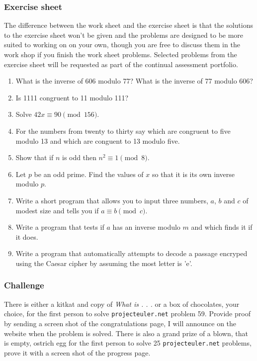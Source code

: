 \documentclass[12pt]{article}
\begin{document}
\subsubsection*{Exercise sheet}

The difference between the work sheet and the exercise sheet is that
the solutions to the exercise sheet won't be given and the problems
are designed to be more suited to working on on your own, though you
are free to discuss them in the work shop if you finish the work sheet
problems. Selected problems from the exercise sheet will be requested
as part of the continual assessment portfolio.

\begin{enumerate}

\item What is the inverse of 606 modulo 77? What is the inverse of 77 modulo 606?

\item Is 1111 congruent to 11 modulo 111?

\item Solve $42x\equiv 90 \pmod {156}$.

\item For the numbers from twenty to thirty say which are congruent to
  five modulo 13 and which are conguent to 13 modulo five.

\item Show that if $n$ is odd then $n^2\equiv 1\pmod 8$.

\item Let $p$ be an odd prime. Find the values of $x$ so that it is
  its own inverse modulo $p$.

\item Write a short program that allows you to input three numbers,
  $a$, $b$ and $c$ of modest size and tells you if $a\equiv b \pmod
  c$.

\item Write a program that tests if $a$ has an inverse modulo $m$ and
  which finds it if it does.

\item Write a program that automatically attempts to decode a passage
  encryped using the Caesar cipher by assuming the most letter is 'e'.

\end{enumerate}


\subsubsection*{Challenge}
There is either a kitkat and copy of \emph{What is . . .} or a box of
chocolates, your choice, for the first person to solve
\texttt{projecteuler.net} problem 59. Provide proof by sending a
screen shot of the congratulations page, I will announce on the
website when the problem is solved. There is also a grand prize of a
blown, that is empty, ostrich egg for the first person to solve 25
\texttt{projecteuler.net} problems, prove it with a screen shot of the
progress page.
\end{document}
